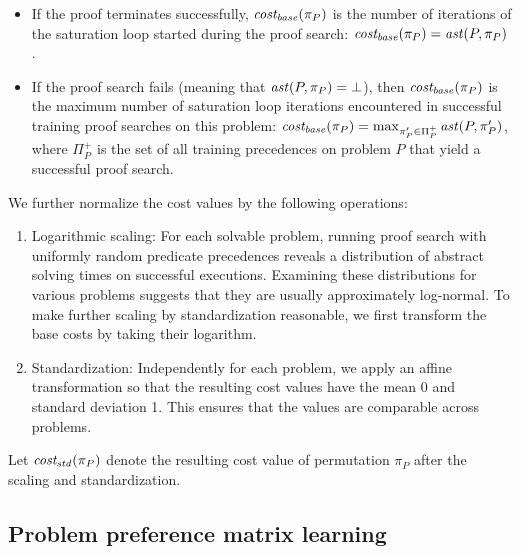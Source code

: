 \begin{itemize}
	\item If the proof terminates successfully,
	\(\operatorname{\mathit{cost_{base}}}(\pi_P)\) is the number of iterations of the saturation loop
	started during the proof search: \(\operatorname{\mathit{cost_{base}}}(\pi_P) = \operatorname{\mathit{ast}}(P, \pi_P)\).
	\item If the proof search fails (meaning that \(\operatorname{\mathit{ast}}(P, \pi_P) = \bot\)),
	then \(\operatorname{\mathit{cost_{base}}}(\pi_P)\) is the maximum number
	of saturation loop iterations encountered in successful training proof searches on this problem:
	\(\operatorname{\mathit{cost_{base}}}(\pi_P) = \max_{\pi_P' \in \Pi^+_P} \operatorname{\mathit{ast}}(P, \pi_P')\),
	where \(\Pi^+_P\) is the set of all training precedences on problem \(P\)
	that yield a successful proof search.
\end{itemize}
We further normalize the cost values by the following operations:
\begin{enumerate}
	\item Logarithmic scaling:
	For each solvable problem, running proof search with uniformly random predicate precedences
	reveals a distribution of abstract solving times on successful executions.
	Examining these distributions for various problems suggests that they are usually
	approximately log-normal.
	To make further scaling by standardization reasonable,
	we first transform the base costs by taking their logarithm.
	\item Standardization: %
	Independently for each problem,
	we apply an affine transformation so that the resulting cost values
	have the mean 0 and standard deviation 1.
	This ensures that the values are comparable across problems.
\end{enumerate}
Let \(\operatorname{\mathit{cost_{std}}}(\pi_P)\) denote the resulting cost value of permutation \(\pi_P\)
after the scaling and standardization.

\subsection{Problem preference matrix learning}
\label{sect:preferences}

